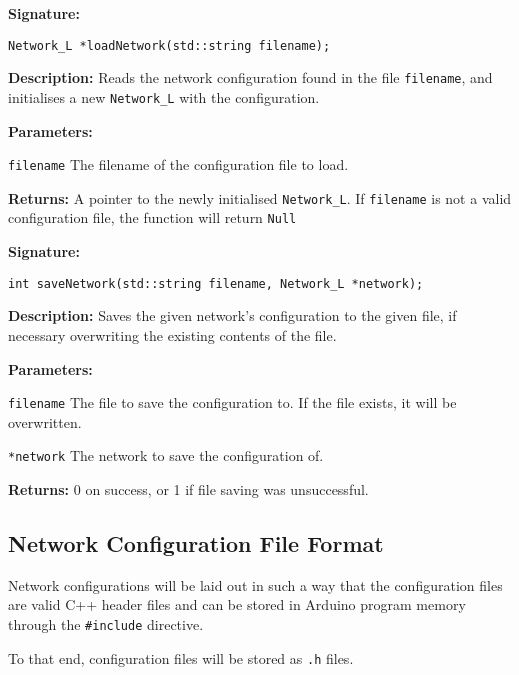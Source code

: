 \documentclass[a4paper]{article}
\begin{document}
\hrulefill %

\textbf{Signature:} \begin{lstlisting}
Network_L *loadNetwork(std::string filename);
\end{lstlisting}

\textbf{Description: }
Reads the network configuration found in the file \lstinline{filename}, and initialises a new \lstinline{Network_L} with the configuration.

\textbf{Parameters: } 

\lstinline{filename} The filename of the configuration file to load. 

\textbf{Returns: }
A pointer to the newly initialised \lstinline{Network_L}. If \lstinline{filename} is not a valid configuration file, the function will return \lstinline{Null}

\hrulefill %

\textbf{Signature:} \begin{lstlisting}
int saveNetwork(std::string filename, Network_L *network);
\end{lstlisting}

\textbf{Description: }
Saves the given network's configuration to the given file, if necessary overwriting the existing contents of the file. 

\textbf{Parameters: } 
 
\lstinline{filename} The file to save the configuration to. If the file exists, it will be overwritten.

\lstinline{*network} The network to save the configuration of. 

\textbf{Returns: }
0 on success, or 1 if file saving was unsuccessful.

\hrulefill %

\subsection{Network Configuration File Format}%

Network configurations will be laid out in such a way that the configuration files are valid C++ header files and can be stored in Arduino program memory through the \lstinline{#include} directive.

To that end, configuration files will be stored as \lstinline{.h} files.
\end{document}
